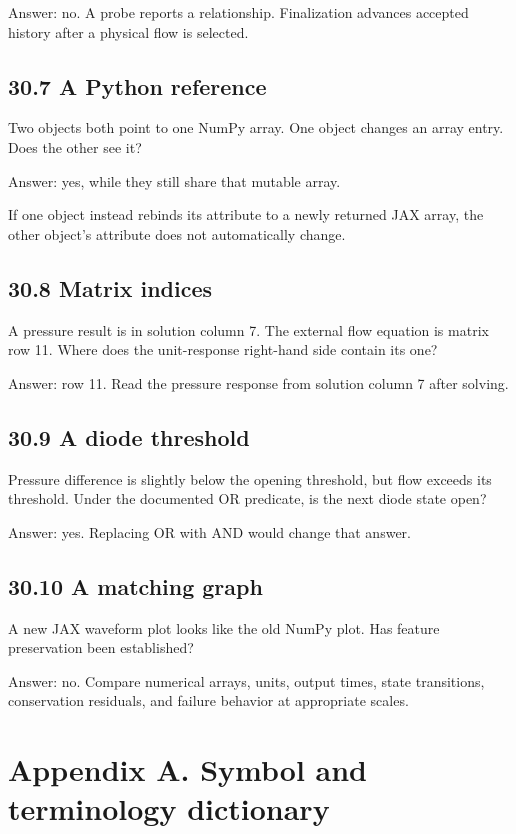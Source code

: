 \documentclass[11pt,a4paper]{article}
\begin{document}
Answer: no. A probe reports a relationship. Finalization advances accepted history after a physical flow is selected.

\subsection{30.7 A Python reference}
Two objects both point to one NumPy array. One object changes an array entry. Does the other see it?

Answer: yes, while they still share that mutable array.

If one object instead rebinds its attribute to a newly returned JAX array, the other object's attribute does not automatically change.

\subsection{30.8 Matrix indices}
A pressure result is in solution column 7. The external flow equation is matrix row 11. Where does the unit-response right-hand side contain its one?

Answer: row 11. Read the pressure response from solution column 7 after solving.

\subsection{30.9 A diode threshold}
Pressure difference is slightly below the opening threshold, but flow exceeds its threshold. Under the documented OR predicate, is the next diode state open?

Answer: yes. Replacing OR with AND would change that answer.

\subsection{30.10 A matching graph}
A new JAX waveform plot looks like the old NumPy plot. Has feature preservation been established?

Answer: no. Compare numerical arrays, units, output times, state transitions, conservation residuals, and failure behavior at appropriate scales.

\clearpage
\section{Appendix A. Symbol and terminology dictionary}
\end{document}
